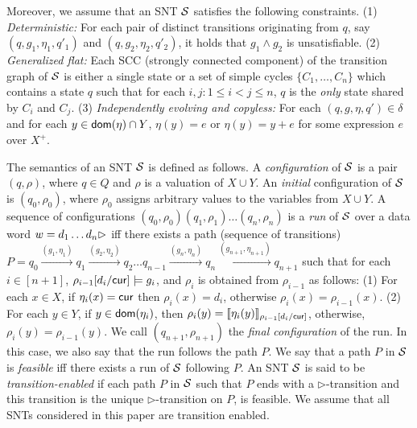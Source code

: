 Moreover, we assume that an SNT ${\mathcal{S} }$ satisfies the following constraints. (1) \emph{Deterministic:} For each pair of distinct transitions originating from $q$, say $(q, g_1, \eta_1,q'_1)$ and $(q, g_2,\eta_2,q'_2)$, it holds that $g_1 \wedge g_2$ is unsatisfiable. (2) \emph{Generalized flat:} Each SCC (strongly connected component) of the transition graph of ${\mathcal{S} }$ is either a single state or a set of simple cycles $\{C_1,\dots, C_n\}$ which contains a state $q$ such that for each $i,j: 1 \le i < j \le n$, $q$ is the \emph{only} state shared by $C_i$ and $C_j$. (3) \emph{Independently evolving and copyless:} For each $(q, g, \eta, q') \in \delta$ and for each $y \in \mathsf{dom}(\eta) \cap Y$, $\eta(y)=e$ or $\eta(y)=y+e$ for some expression $e$ over $X^+$.

The semantics of an SNT ${\mathcal{S} }$  is defined as follows. A \emph{configuration} of ${\mathcal{S} }$ is a pair $(q,\rho)$, where $q \in Q$ and $\rho$ is a valuation of $X \cup Y$. An \emph{initial} configuration of ${\mathcal{S} }$ is $(q_0,\rho_0)$, where $\rho_0$ assigns arbitrary values to the variables from $X\cup Y$.
A sequence of configurations $(q_0,\rho_0)(q_1,\rho_1)\ldots(q_n,\rho_n)$ is
a \emph{run} of ${\mathcal{S} }$ over a data word $w=d_1 \dots d_n \rhd$ iff there exists a path (sequence of transitions) $P=q_0 \xrightarrow{(g_1,\eta_1)} q_1 \xrightarrow{(g_2,\eta_2)} q_2 \dots q_{n-1} \xrightarrow{(g_n, \eta_n)} q_n \xrightarrow{(g_{n+1}, \eta_{n+1})} q_{n+1}$ such that for each $i \in [n+1]$, $\rho_{i-1}[d_i/\mathsf{cur}] \models g_i$, and $\rho_i$ is obtained from $\rho_{i-1}$ as follows: (1) For each $x \in X$, if $\eta_i(x)=\mathsf{cur}$ then $\rho_i(x)=d_i$,  otherwise $\rho_i(x)=\rho_{i-1}(x)$. (2) For each $y \in Y$, if $y \in \mathsf{dom}(\eta_i)$, then $\rho_i(y)=\llbracket\eta_i(y)\rrbracket_{\rho_{i-1}[d_i/\mathsf{cur}]}$, otherwise, $\rho_i(y)=\rho_{i-1}(y)$.
We call $(q_{n+1},\rho_{n+1})$ the \emph{final configuration} of the run. In this case, we also say that the run follows the path $P$.
We say that a path $P$ in ${\mathcal{S} }$ is \emph{feasible} iff there exists a run of ${\mathcal{S} }$ following $P$. 
An SNT ${\mathcal{S} }$ is said to be \emph{transition-enabled} if each path $P$ in ${\mathcal{S} }$ such that $P$ ends with a $\triangleright$-transition and this transition is the unique $\triangleright$-transition on $P$,  is feasible. We assume that all SNTs considered in this paper are transition enabled.


